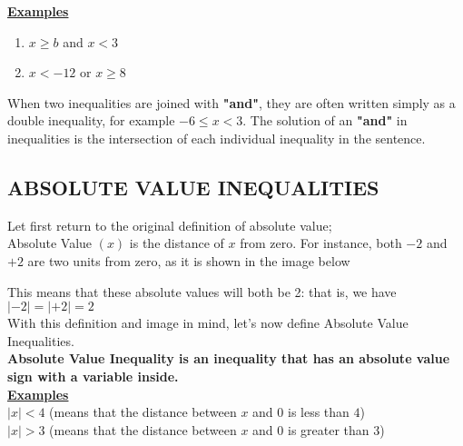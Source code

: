 \documentclass[12pt]{report}
\newcommand{\bt}[1]{\textbf{#1}}
\newcommand{\ubt}[1]{\textbf{\underline{#1}}}
\newcommand{\spn}[1]{\\[#1cm]}
\newcommand{\NI}{\noindent}
\begin{document}
	\NI\ubt{Examples}
	\begin{enumerate}
		\item $x \geq b$ and $x < 3$
		\item $x < -12$ or $x \geq 8$
	\end{enumerate}
		
	When two inequalities are joined with \bt{"and"}, they are often written simply as a double inequality, for example $-6 \leq x < 3$. The solution of an \bt{"and"} in inequalities is the intersection of each individual inequality in the sentence.
		
	\subsection{ABSOLUTE VALUE INEQUALITIES}
	Let first return to the original definition of absolute value;\\
	
	\NI Absolute Value $(x)$ is the distance of $x$ from zero. For instance, both $-2$ and $+2$ are two units from zero, as it is shown in the image below\\
		
	\begin{center}
	\end{center}
		
	\NI This means that these absolute values will both be 2: that is, we have $|-2| = |+2| = 2$\\
	
	\NI With this definition and image in mind, let's now define Absolute Value Inequalities.\spn{-.5}
		
	\NI\bt{Absolute Value Inequality is an inequality that has an absolute value sign with a variable inside.}\spn{-.4}
		
	\NI\ubt{Examples}\\
	$|x| < 4$ (means that the distance between $x$ and $0$ is less than $4$)\\
	$|x| > 3$ (means that the distance between $x$ and $0$ is greater than $3$)\\
		
\end{document}
